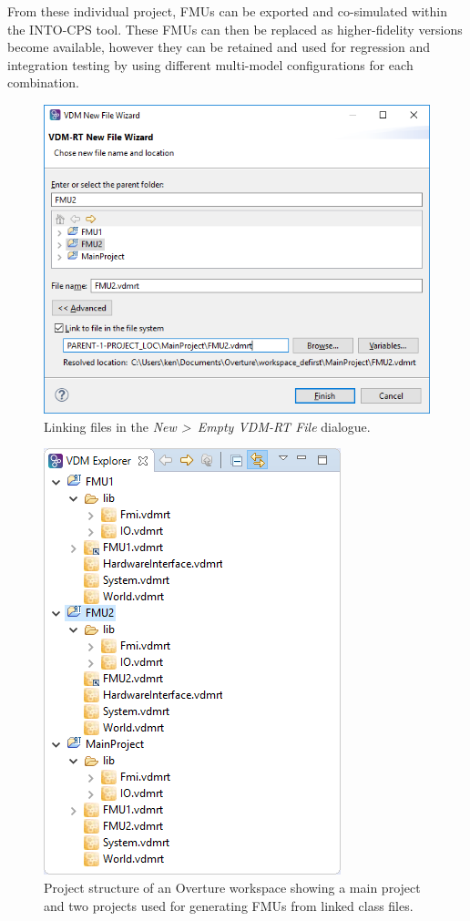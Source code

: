 From these individual project, FMUs can be exported and co-simulated within the INTO-CPS tool. These FMUs can then be replaced as higher-fidelity versions become available, however they can be retained and used for regression and integration testing by using different multi-model configurations for each combination.

\begin{figure}
\centering
\includegraphics[scale=0.8]{figures/defirst_link}
\caption{Linking files in the \emph{New \textgreater\ Empty VDM-RT File} dialogue.}
\label{fig:defirst_link}
\end{figure}

\begin{figure}
\centering
\includegraphics[scale=0.8]{figures/defirst_workspace}
\caption{Project structure of an Overture workspace showing a main project and two projects used for generating FMUs from linked class files.}
\label{fig:defirst_workspace}
\end{figure}



